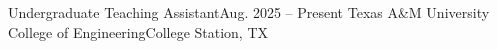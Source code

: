 \resumeSubheading
  {Undergraduate Teaching Assistant}{Aug. 2025 -- Present}
  {Texas A\&M University College of Engineering}{College Station, TX}
  \resumeItemListStart
    
  \resumeItemListEnd
